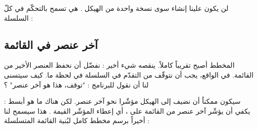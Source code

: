 لن يكون علينا إنشاء سوى نسخة واحدة من الهيكل
.
هي تسمح بالتحكّم في كلّ السلسلة :
 

\subsection{آخر عنصر في القائمة}

المخطط أصبح تقريباً كاملاً. ينقصه شيء أخير : نفضّل أن نحفظ العنصر الأخير من القائمة. في الواقع، يجب أن نتوقّف من التقدّم في السلسلة في لحظة ما. كيف سيتسنى لنا أن نقول للبرنامج : "توقف، هذا هو آخر عنصر" ؟

سيكون ممكناً أن نضيف إلى الهيكل 
مؤشّرا نحو آخر عنصر. لكن هناك ما هو أبسط : يكفي أن يؤشّر آخر عنصر من القائمة على
،
أي إعطاء المؤشّر
القيمة
.
هذا سيسمح لنا أخيراً برسم مخطط كامل لبُنية القائمة المتسلسلة :


